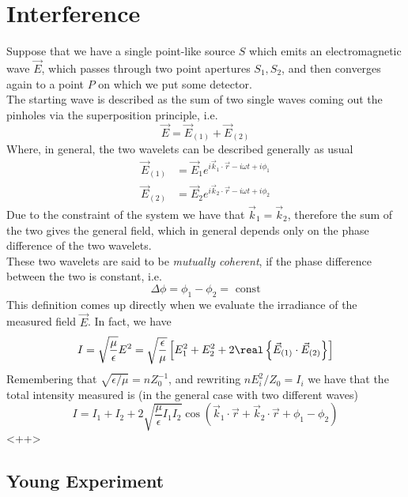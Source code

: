 \documentclass[../electromagnetism.tex]{subfiles}
\begin{document}
\section{Interference}
Suppose that we have a single point-like source $S$ which emits an electromagnetic wave $\vec{E}$, which passes through two point apertures $S_1, S_2$, and then converges again to a point $P$ on which we put some detector.\\
The starting wave is described as the sum of two single waves coming out the pinholes via the superposition principle, i.e.
\begin{equation*}
	\vec{E}=\vec{E}_{(1)}+\vec{E}_{(2)}
\end{equation*}
Where, in general, the two wavelets can be described generally as usual
\begin{equation}
	\begin{aligned}
		\vec{E}_{(1)}&= \vec{E}_1e^{i\vec{k}_1\cdot\vec{r}-i\omega t+i\phi_1}\\
		\vec{E}_{(2)}&= \vec{E}_2e^{i\vec{k}_2\cdot\vec{r}-i\omega t+i\phi_2}
	\end{aligned}
	\label{eq:afterpin.int}
\end{equation}
Due to the constraint of the system we have that $\vec{k}_1=\vec{k}_2$, therefore the sum of the two gives the general field, which in general depends only on the phase difference of the two wavelets.\\
These two wavelets are said to be \textit{mutually coherent}, if the phase difference between the two is constant, i.e.
\begin{equation}
	\Delta\phi=\phi_1-\phi_2=\text{ const}
	\label{eq:coherencedef.int}
\end{equation}
This definition comes up directly when we evaluate the irradiance of the measured field $\vec{E}$. In fact, we have
\begin{equation*}
	I=\sqrt{\frac{\mu}{\epsilon}}E^2=\sqrt{\frac{\epsilon}{\mu}}\left[ E_1^2+E_2^2+2\real\left\{ \vec{E}_{(1)}\cdot\vec{E}_{(2)} \right\} \right]
\end{equation*}
Remembering that $\sqrt{\epsilon/\mu}=nZ_0^{-1}$, and rewriting $nE_i^2/Z_0=I_i$ we have that the total intensity measured is (in the general case with two different waves)
\begin{equation}
	I=I_1+I_2+2\sqrt{\frac{\mu}{\epsilon}I_1I_2}\cos\left( \vec{k}_1\cdot\vec{r}+\vec{k}_2\cdot\vec{r}+\phi_1-\phi_2 \right)
	\label{eq:<+label+>}
\end{equation}<++>
\subsection{Young Experiment}
\end{document}
